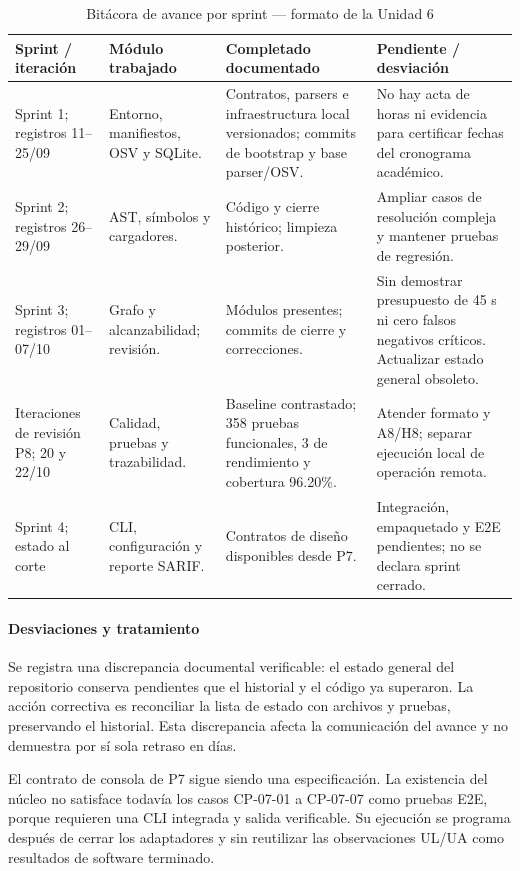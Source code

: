 \begin{table}[H]
\centering\small{}
\caption{Bitácora de avance por sprint --- formato de la Unidad 6}
\begin{tabularx}{\textwidth}{P{2cm}P{2.7cm}YY}
\toprule
\textbf{Sprint / iteración} & \textbf{Módulo trabajado} & \textbf{Completado documentado} & \textbf{Pendiente / desviación} \\
\midrule
Sprint 1; registros 11--25/09 & Entorno, manifiestos, OSV y SQLite. & Contratos, parsers e infraestructura local versionados; commits de bootstrap y base parser/OSV. & No hay acta de horas ni evidencia para certificar fechas del cronograma académico. \\
\addlinespace
Sprint 2; registros 26--29/09 & AST, símbolos y cargadores. & Código y cierre histórico; limpieza posterior. & Ampliar casos de resolución compleja y mantener pruebas de regresión. \\
\addlinespace
Sprint 3; registros 01--07/10 & Grafo y alcanzabilidad; revisión. & Módulos presentes; commits de cierre y correcciones. & Sin demostrar presupuesto de 45 s ni cero falsos negativos críticos. Actualizar estado general obsoleto. \\
\addlinespace
Iteraciones de revisión P8; 20 y 22/10 & Calidad, pruebas y trazabilidad. & Baseline contrastado; 358 pruebas funcionales, 3 de rendimiento y cobertura 96.20\%. & Atender formato y A8/H8; separar ejecución local de operación remota. \\
\addlinespace
Sprint 4; estado al corte & CLI, configuración y reporte SARIF. & Contratos de diseño disponibles desde P7. & Integración, empaquetado y E2E pendientes; no se declara sprint cerrado. \\
\bottomrule
\end{tabularx}
\end{table}

\paragraph*{Desviaciones y tratamiento}
Se registra una discrepancia documental verificable: el estado general del repositorio conserva pendientes que el historial y el código ya superaron. La acción correctiva es reconciliar la lista de estado con archivos y pruebas, preservando el historial. Esta discrepancia afecta la comunicación del avance y no demuestra por sí sola retraso en días.

El contrato de consola de P7 sigue siendo una especificación. La existencia del núcleo no satisface todavía los casos CP-07-01 a CP-07-07 como pruebas E2E, porque requieren una CLI integrada y salida verificable. Su ejecución se programa después de cerrar los adaptadores y sin reutilizar las observaciones UL/UA como resultados de software terminado.


